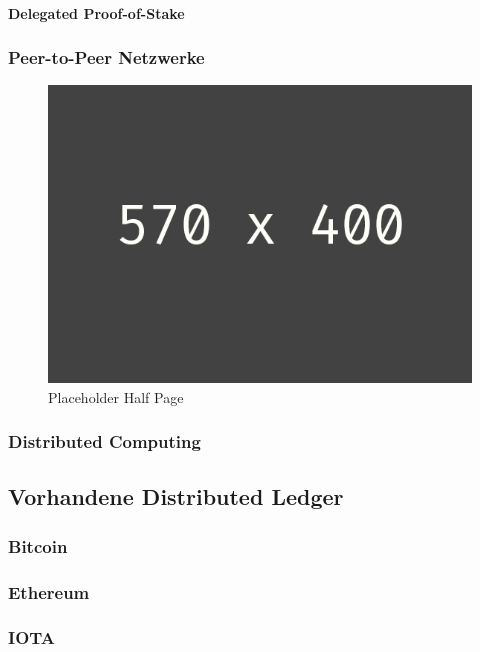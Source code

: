 \paragraph{Delegated Proof-of-Stake}


\subsubsection{Peer-to-Peer Netzwerke}
\begin{figure}[h!]
	\centering
	\includegraphics[width=1.0\linewidth]{pictures/placeholder_half_page}
	\caption[Placeholder Half Page]{Placeholder Half Page}
	\label{fig:placeholder_half_page}
\end{figure}


\subsubsection{Distributed Computing}


\subsection{Vorhandene Distributed Ledger}


\subsubsection{Bitcoin}


\subsubsection{Ethereum}


\subsubsection{IOTA}


